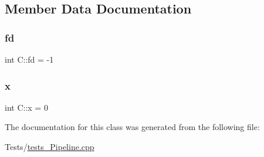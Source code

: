 \subsection{Member Data Documentation}
\mbox{\label{class_c_a7d63b9c907f2a1200cd3e173cee9751e}} 
\subsubsection{\texorpdfstring{fd}{fd}}
{\footnotesize\ttfamily int C\+::fd = -\/1}

\mbox{\label{class_c_a644bc4405a602578b65e83d317a2f3eb}} 
\subsubsection{\texorpdfstring{x}{x}}
{\footnotesize\ttfamily int C\+::x = 0}



The documentation for this class was generated from the following file\+:\begin{DoxyCompactItemize}
\item 
Tests/\mbox{\hyperlink{tests___pipeline_8cpp}{tests\+\_\+\+Pipeline.\+cpp}}\end{DoxyCompactItemize}
